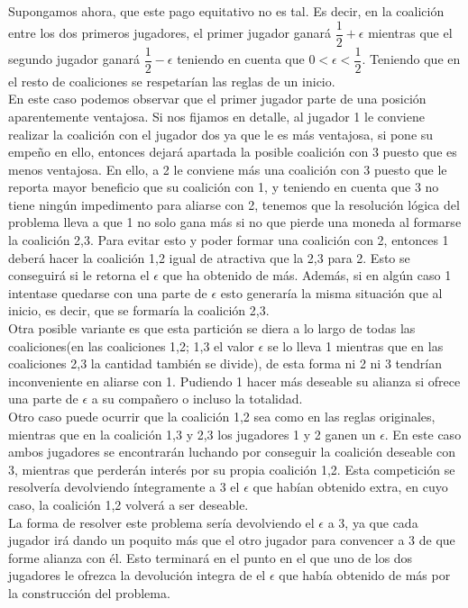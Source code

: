 \documentclass[10pt,a4paper]{book}
\begin{document}
Supongamos ahora, que este pago equitativo no es tal. Es decir, en la coalición entre los dos primeros jugadores, el primer jugador ganará $\dfrac{1}{2}+\epsilon$ mientras que el segundo jugador ganará $\dfrac{1}{2}-\epsilon$ teniendo en cuenta que $ 0 < \epsilon <\dfrac{1}{2}$. Teniendo que en el resto de coaliciones se respetarían las reglas de un inicio. \\
En este caso podemos observar que el primer jugador parte de una posición aparentemente ventajosa. Si nos fijamos en detalle, al jugador 1 le conviene realizar la coalición con el jugador dos ya que le es más ventajosa, si pone su empeño en ello, entonces dejará apartada la posible coalición con 3 puesto que es menos ventajosa. En ello, a 2 le conviene más una coalición con 3 puesto que le reporta mayor beneficio que su coalición con 1, y teniendo en cuenta que 3 no tiene ningún impedimento para aliarse con 2, tenemos que la resolución lógica del problema lleva a que 1 no solo gana más si no que pierde una moneda al formarse la coalición 2,3. Para evitar esto y poder formar una coalición con 2, entonces 1 deberá hacer la coalición 1,2 igual de atractiva que la 2,3 para 2. Esto se conseguirá si le retorna el $\epsilon$ que ha obtenido de más. Además, si en algún caso 1 intentase quedarse con una parte de $\epsilon$ esto generaría la misma situación que al inicio, es decir, que se formaría la coalición 2,3.\\

Otra posible variante es que esta partición se diera a lo largo de todas las coaliciones(en las coaliciones 1,2; 1,3 el valor $\epsilon$ se lo lleva 1 mientras que en las coaliciones 2,3 la cantidad también se divide), de esta forma ni 2 ni 3 tendrían inconveniente en aliarse con 1. Pudiendo 1 hacer más deseable su alianza si ofrece una parte de $\epsilon$ a su compañero o incluso la totalidad.\\

Otro caso puede ocurrir que la coalición 1,2 sea como en las reglas originales, mientras que en la coalición 1,3 y 2,3 los jugadores 1 y 2 ganen un $\epsilon$. En este caso ambos jugadores se encontrarán luchando por conseguir la coalición deseable con 3, mientras que perderán interés por su propia coalición 1,2. Esta competición se resolvería devolviendo íntegramente a 3 el $\epsilon$ que habían obtenido extra, en cuyo caso, la coalición 1,2 volverá a ser deseable.\\
La forma de resolver este problema sería devolviendo el $\epsilon$ a 3, ya que cada jugador irá dando un poquito más que el otro jugador para convencer a 3 de que forme alianza con él. Esto terminará en el punto en el que uno de los dos jugadores le ofrezca la devolución integra de el $\epsilon$ que había obtenido de más por la construcción del problema.\\
\end{document}
